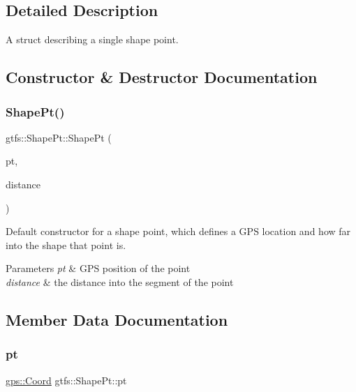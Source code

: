 \subsection{Detailed Description}
A struct describing a single shape point. 

\subsection{Constructor \& Destructor Documentation}
\mbox{\label{structgtfs_1_1ShapePt_a34e7da183770e2ab8360e286596ff18a}} 
\subsubsection{\texorpdfstring{Shape\+Pt()}{ShapePt()}}
{\footnotesize\ttfamily gtfs\+::\+Shape\+Pt\+::\+Shape\+Pt (\begin{DoxyParamCaption}\item[{\hyperlink{classgps_1_1Coord}{gps\+::\+Coord}}]{pt,  }\item[{double}]{distance }\end{DoxyParamCaption})\hspace{0.3cm}{\ttfamily [inline]}}

Default constructor for a shape point, which defines a G\+PS location and how far into the shape that point is.


\begin{DoxyParams}{Parameters}
{\em pt} & G\+PS position of the point \\
\hline
{\em distance} & the distance into the segment of the point \\
\hline
\end{DoxyParams}


\subsection{Member Data Documentation}
\mbox{\label{structgtfs_1_1ShapePt_ab79eb8263213afd27be9b257fca8515a}} 
\subsubsection{\texorpdfstring{pt}{pt}}
{\footnotesize\ttfamily \hyperlink{classgps_1_1Coord}{gps\+::\+Coord} gtfs\+::\+Shape\+Pt\+::pt}

